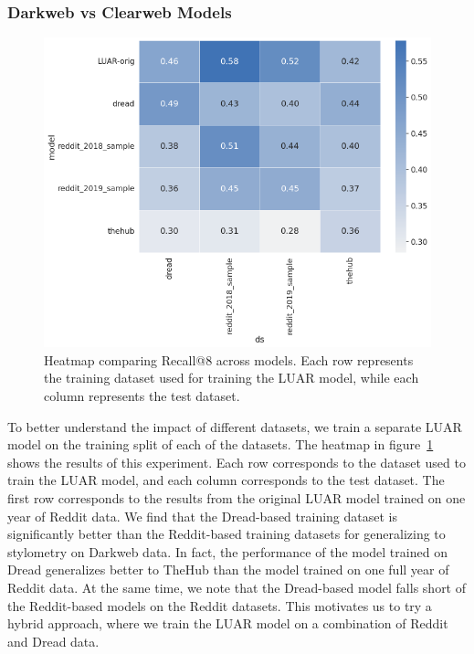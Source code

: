 \subsubsection{Darkweb vs Clearweb Models}
\begin{figure}
    \centering
    \includegraphics[width=0.8\linewidth]{stylometryExtensions/figures/results/rq2_trainedmodels} 
    \caption{Heatmap comparing Recall@8 across models. Each row represents the training dataset used for training the LUAR model, while each column represents the test dataset.}
    \label{fig:stylometry_extensions:followingTrail:results:rq2_trainedmodels}
\end{figure}
To better understand the impact of different datasets, we train a separate LUAR model on the training split of each of the datasets.
The heatmap in figure~\ref{fig:stylometry_extensions:followingTrail:results:rq2_trainedmodels} shows the results of this experiment.
Each row corresponds to the dataset used to train the LUAR model, and each column corresponds to the test dataset.
The first row corresponds to the results from the original LUAR model trained on one year of Reddit data.
We find that the Dread-based training dataset is significantly better than the Reddit-based training datasets for generalizing to stylometry on Darkweb data.
In fact, the performance of the model trained on Dread generalizes better to TheHub than the model trained on one full year of Reddit data.
At the same time, we note that the Dread-based model falls short of the Reddit-based models on the Reddit datasets.
This motivates us to try a hybrid approach, where we train the LUAR model on a combination of Reddit and Dread data.

